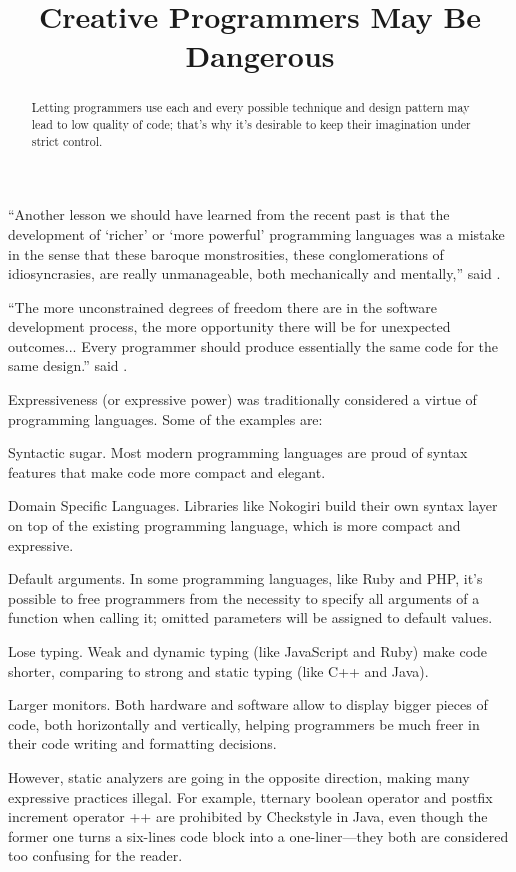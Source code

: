 \documentclass{main}
\title{Creative Programmers May Be Dangerous}
\begin{document}
\begin{abstract}
Letting programmers use each and every possible technique and design pattern may lead to low quality of code;
that's why it's desirable to keep their imagination under strict control.
\end{abstract}

``Another lesson we should
have learned from the recent past is
that the development of `richer' or
`more powerful' programming languages
was a mistake in the sense
that these baroque monstrosities,
these conglomerations of idiosyncrasies,
are really unmanageable, both
mechanically and mentally,'' said \textcite{dijkstra1972}.

``The more unconstrained degrees of freedom there are in the software
development process, the more opportunity there will be for
unexpected outcomes... Every programmer should produce essentially the
same code for the same design.'' said \textcite{munson2003}.

Expressiveness (or expressive power) was traditionally considered a virtue of programming languages.
Some of the examples are:

Syntactic sugar. Most modern programming languages are proud of syntax
  features that make code more compact and elegant.

Domain Specific Languages. Libraries like Nokogiri build their own
  syntax layer on top of the existing programming language, which is more
  compact and expressive.

Default arguments. In some programming languages, like Ruby and PHP,
  it's possible to free programmers from the necessity to specify
  all arguments of a function when calling it; omitted parameters will
  be assigned to default values.

Lose typing. Weak and dynamic typing (like JavaScript and Ruby)
  make code shorter, comparing to strong and static typing (like C++ and Java).

Larger monitors. Both hardware and software allow to display bigger
  pieces of code, both horizontally and vertically, helping programmers
  be much freer in their code writing and formatting decisions.

However, static analyzers are going in the opposite direction,
making many expressive practices illegal.
For example, tternary boolean operator and
postfix increment operator ++ are prohibited by Checkstyle in Java, even
though the former one turns a six-lines code block into a one-liner---they
both are considered too confusing for the reader.
\end{document}
